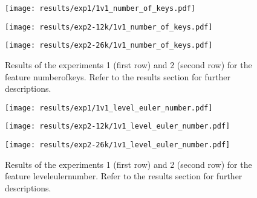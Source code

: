  
\begin{figure}[h!]
    \centering
	\begin{minipage}{0.3\linewidth}
		\texttt{[image: results/exp1/1v1\_number\_of\_keys.pdf]}
	\end{minipage}

	\begin{minipage}{0.3\linewidth}
		\texttt{[image: results/exp2-12k/1v1\_number\_of\_keys.pdf]}
	\end{minipage}
	\begin{minipage}{0.3\linewidth}
		\texttt{[image: results/exp2-26k/1v1\_number\_of\_keys.pdf]}
	\end{minipage}

	\caption[ Results: Feature number\textunderscore of\textunderscore keys]{ Results of the experiments 1 (first row) and 2 (second row) for the feature number\textunderscore of\textunderscore keys. Refer to the results section for further descriptions. }
	\label{fig:appendix_number_of_keys}
\end{figure}
 
\begin{figure}[h!]
    \centering
	\begin{minipage}{0.3\linewidth}
		\texttt{[image: results/exp1/1v1\_level\_euler\_number.pdf]}
	\end{minipage}

	\begin{minipage}{0.3\linewidth}
		\texttt{[image: results/exp2-12k/1v1\_level\_euler\_number.pdf]}
	\end{minipage}
	\begin{minipage}{0.3\linewidth}
		\texttt{[image: results/exp2-26k/1v1\_level\_euler\_number.pdf]}
	\end{minipage}

	\caption[ Results: Feature level\textunderscore euler\textunderscore number]{ Results of the experiments 1 (first row) and 2 (second row) for the feature level\textunderscore euler\textunderscore number. Refer to the results section for further descriptions. }
	\label{fig:appendix_level_euler_number}
\end{figure}
 \newpage 

